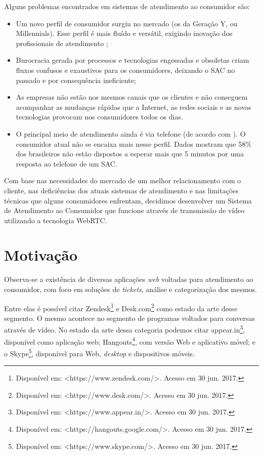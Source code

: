 Alguns problemas encontrados em sistemas de atendimento ao consumidor são:
\begin{itemize}
\item Um novo perfil de consumidor surgiu no mercado (os da Geração Y, ou Millennials). Esse perfil é mais fluído e versátil, exigindo inovação dos profissionais de atendimento \cite{salesforcestateofservice2015};
\item Burocracia gerada por processos e tecnologias engessadas e obsoletas criam fluxos confusos e exaustivos para os consumidores, deixando o SAC no passado e por consequência ineficiente;
\item As empresas não estão nos mesmos canais que os clientes e não conseguem acompanhar as mudanças rápidas que a Internet, as redes sociais e as novas tecnologias provocam nos consumidores todos os dias.
\item O principal meio de atendimento ainda é via telefone (de acordo com \cite{cenariodossacs2015}). O consumidor atual não se encaixa mais nesse perfil. Dados mostram que 58\% dos brasileiros não estão dispostos a esperar mais que 5 minutos por uma resposta ao telefone de um SAC.
\end{itemize}

Com base nas necessidades do mercado de um melhor relacionamento com o cliente, nas deficiências dos atuais sistemas de atendimento e nas limitações técnicas que alguns consumidores enfrentam, decidimos desenvolver um Sistema de Atendimento ao Consumidor que funcione através de transmissão de vídeo utilizando a tecnologia WebRTC.

\section{Motivação}
Observa-se a existência de diversas aplicações \textit{web} voltadas para atendimento ao consumidor, com foco em soluções de \textit{tickets}, análise e categorização dos mesmos. 

Entre elas é possível citar Zendesk\footnote{Disponível em: <https://www.zendesk.com/>. Acesso em 30 jun. 2017.} e Desk.com\footnote{Disponível em: <https://www.desk.com/>. Acesso em 30 jun. 2017.} como estado da arte desse segmento. O mesmo acontece no segmento de programas voltados para conversas através de vídeo. No estado da arte dessa categoria podemos citar appear.in\footnote{Disponível em: <https://www.appear.in/>. Acesso em 30 jun. 2017.}, disponível como aplicação web; Hangouts\footnote{Disponível em: <https://hangouts.google.com/>. Acesso em 30 jun. 2017.}, com versão Web e aplicativo móvel; e o Skype\footnote{Disponível em: <https://www.skype.com/>. Acesso em 30 jun. 2017.}, disponível para Web, \textit{desktop} e dispositivos móveis.

